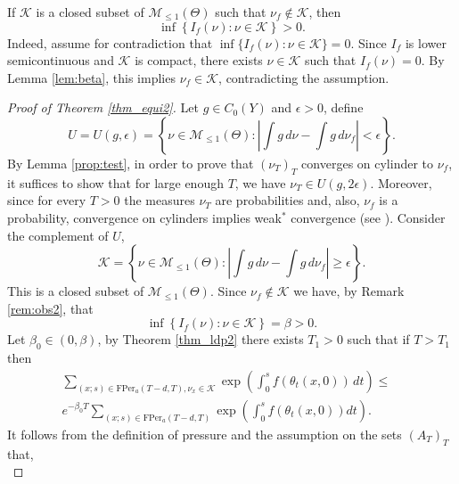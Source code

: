 \documentclass[letterpaper,11pt]{amsart}
\numberwithin{equation}{section}     %
\newcommand{\K}{\mathcal{K}}
\newcommand{\M}{\mathcal{M}}
\def\M{{\mathcal M}}
\def\le{\leqslant}
\def\M{\mathcal{M}}
\begin{document}
\begin{remark}\label{rem:obs2} If $\mathcal{K}$ is a closed subset of $\M_{\le1}(\Theta)$ such that $\nu_f\notin \mathcal{K}$, then 
$$\inf \left\{I_f(\nu):\nu\in\mathcal{K} \right\}>0.$$
Indeed, assume for contradiction that $\inf\{I_f(\nu):\nu\in \mathcal{K}\}=0$. Since $I_f$ is lower semicontinuous and $\mathcal{K}$ is compact, there exists $\nu\in \mathcal{K}$ such that $I_f(\nu)=0$. By Lemma \ref{lem:beta}, this implies $\nu_f\in \mathcal{K}$, contradicting the assumption.
\end{remark}



\begin{proof}[Proof of Theorem \ref{thm_equi2}]

Let $g \in C_0(Y)$ and $\epsilon >0$, define
\begin{equation*}
U=U(g, \epsilon)= \left\{\nu \in \M_{\le1}(\Theta) :    \left| \int g \, d \nu - \int g \, d \nu_f   \right| < \epsilon \right\}.
\end{equation*}
By Lemma \ref{prop:test}, in order to prove that $(\nu_T)_T$ converges on cylinder to $\nu_f$, it suffices to show that for  large enough $T$, we have $\nu_T \in U(g, 2 \epsilon)$. Moreover, since for every $T >0$ the measures $\nu_T$ are probabilities and, also, $\nu_f$ is a probability, convergence on cylinders implies weak$^\ast$ convergence (see \cite[Lemma 6.7]{iv}).   Consider the complement of $U$,
\begin{equation*}
\K =\left\{\nu \in \M_{\le1}(\Theta) :    \left| \int g \, d \nu - \int g \, d \nu_f   \right| \geq  \epsilon \right\}.
\end{equation*}
This is a closed subset of $\M_{\le1}(\Theta)$. Since $\nu_f \notin \K$ we have, by Remark \ref{rem:obs2}, that
\begin{equation*}
\inf \left\{I_f(\nu):\nu\in\mathcal{K} \right\}= \beta>0.
\end{equation*}
Let $\beta_0 \in (0, \beta)$, by Theorem \ref{thm_ldp2}  there exists $T_1>0$ such that if $T>T_1$ then
\begin{align} \label{1}
\sum_{(x;s)\in \mathrm{FPer}_a(T-d,T), \nu_{x}\in \mathcal{K}}\exp\left(\int_0^{s}f(\theta_t(x,0)) \,dt\right)
\leq&\\ e^{-\beta_0 T}   \sum_{(x;s)\in \mathrm{FPer}_a(T-d,T)}\exp\left(\int_0^{s}f(\theta_t(x,0))dt\right).
\end{align}
It follows from the definition of pressure and the assumption on the sets $(A_T)_T$ that,
\begin{equation*}

\end{equation*}
\end{proof}
\end{document}
